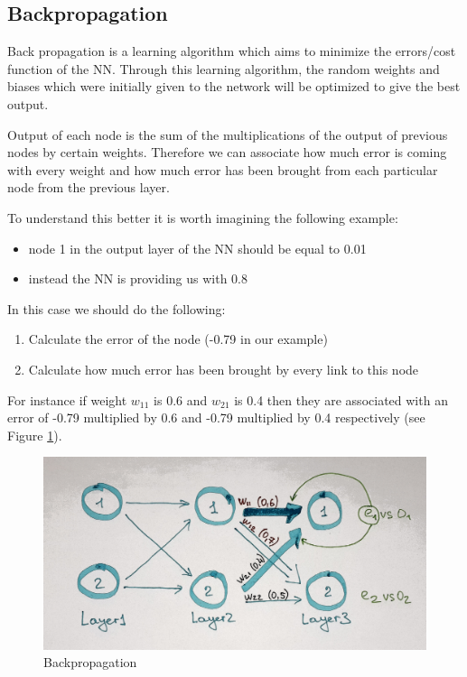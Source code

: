 \subsection{Backpropagation}

Back propagation is a learning algorithm which aims to minimize the errors/cost function of the NN. Through this learning algorithm, the random weights and biases which were initially given to the network will be optimized to give the best output.

Output of each node is the sum of the multiplications of the output of previous nodes by certain weights. Therefore we can associate how much error is coming with every weight and how much error has been brought from each particular node from the previous layer.

To understand this better it is worth imagining the following example:
\begin{itemize}
   \item  node 1 in the output layer of the NN should be equal to 0.01
   \item  instead the NN is providing us with 0.8
\end{itemize}

In this case we should do the following:
\begin{enumerate}
   \item Calculate the error of the node (-0.79 in our example)
   \item Calculate how much error has been brought by every link to this node
\end{enumerate}

For instance if weight \(w_{11}\) is 0.6 and \(w_{21}\) is 0.4 then they are associated with an error of -0.79 multiplied by 0.6 and -0.79 multiplied by 0.4 respectively (see Figure \ref{fig:bp}).

\begin{figure}[H]
    \includegraphics[width=\linewidth]{pics/bp.jpg}
    \caption{\label{fig:bp} Backpropagation}
\end{figure}

